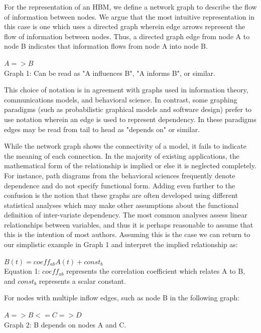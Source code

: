 \documentclass[runningheads,a4paper]{llncs}
\begin{document}
For the representation of an HBM, we define a network graph to describe the flow of information between nodes.
We argue that the most intuitive representation in this case is one which uses a directed graph wherein edge arrows represent the flow of information between nodes.
Thus, a directed graph edge from node A to node B indicates that information flows from node A into node B. 

\begin{centering}
  $A => B$\\
  \small{Graph 1: Can be read as "A influences B", "A informs B", or similar.}
\end{centering}
  
This choice of notation is in agreement with graphs used in information theory, communications models, and behavioral science.
In contrast, some graphing paradigms (such as probabilistic graphical models and software design) prefer to use notation wherein an edge is used to represent dependency.
In these paradigms edges may be read from tail to head as "depends on" or similar.

While the network graph shows the connectivity of a model, it fails to indicate the meaning of each connection.
In the majority of existing applications, the mathematical form of the relationship is implied or else it is neglected completely.
For instance, path diagrams from the behavioral sciences frequently denote dependence and do not specify functional form.
Adding even further to the confusion is the notion that these graphs are often developed using different statistical analyses which may make other assumptions about the functional definition of inter-variate dependency.
The most common analyses assess linear relationships between variables, and thus it is perhaps reasonable to assume that this is the intention of most authors.
Assuming this is the case we can return to our simplistic example in Graph 1 and interpret the implied relationship as:

\begin{centering}
$B(t) = coeff_{ab}A(t) + const_b$\\
\small{Equation 1: $coeff_{ab}$ represents the correlation coefficient which relates A to B, and $const_b$ represents a scalar constant.}
\end{centering}

For nodes with multiple inflow edges, such as node B in the following graph:

\begin{centering}
$A => B <= C => D$\\
\small{Graph 2: B depends on nodes A and C.}
\end{centering}
\end{document}
